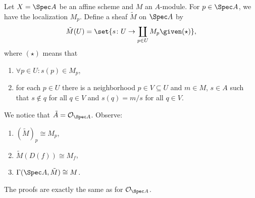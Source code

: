 Let $X = \Spec A$ be an affine scheme and $M$ an $A$-module.
For $p \in \Spec A$, we have the localization $M_p$. Define a sheaf
$\tilde{M}$ on $\Spec A$ by
\[ \tilde{M}(U) = \set{s\colon U\to \coprod_{p \in U} M_p\given (\star)}, \]
where $(\star)$ means that
\begin{enumerate}
	\item $\forall p \in U\colon s(p) \in M_p$,
	\item for each $p \in U$ there is a neighborhood $p \in V \subseteq U$ and
		$m \in M$, $s \in A$ such that $s\notin q$ for all $q \in V$ and
		$s(q) = m/s$ for all $q \in V$.
\end{enumerate}
We notice that $\tilde{A} = \mathcal{O}_{\Spec A}$. Observe:
\begin{enumerate}
	\item $(\tilde{M})_p \cong M_p$,
	\item $\tilde{M}(D(f)) \cong M_f$,
	\item $\Gamma(\Spec A, \tilde{M}) \cong M$.
\end{enumerate}
The proofs are exactly the same as for $\mathcal{O}_{\Spec A}$.

